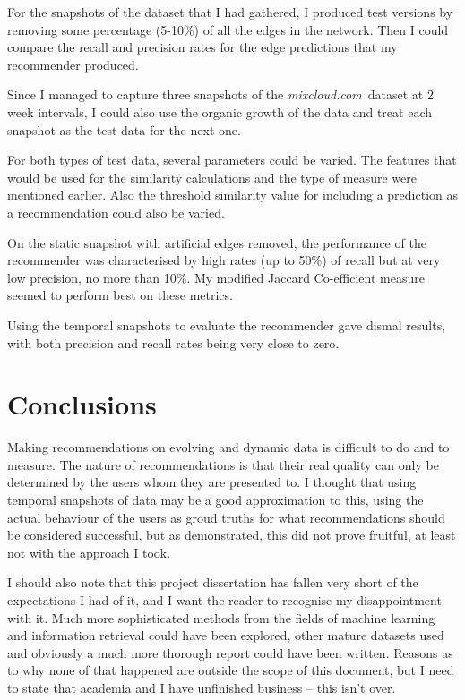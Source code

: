 \documentclass[a4paper,12pt,twoside,notitlepage]{report}
\def\mixurl{\emph{mixcloud.com}}
\begin{document}
For the snapshots of the dataset that I had gathered, I produced test versions
by removing some percentage (5-10\%) of all the edges in the network. Then I
could compare the recall and precision rates for the edge predictions that my
recommender produced.

Since I managed to capture three snapshots of the \mixurl\ dataset at 2 week
intervals, I could also use the organic growth of the data and treat each
snapshot as the test data for the next one.

For both types of test data, several parameters could be varied. The features
that would be used for the similarity calculations and the type of measure were
mentioned earlier. Also the threshold similarity value for including a
prediction as a recommendation could also be varied.

On the static snapshot with artificial edges removed, the performance of the
recommender was characterised by high rates (up to 50\%) of recall but at very
low precision, no more than 10\%. My modified Jaccard Co-efficient measure
seemed to perform best on these metrics.

Using the temporal snapshots to evaluate the recommender gave dismal results,
with both precision and recall rates being very close to zero.
\chapter{Conclusions}

Making recommendations on evolving and dynamic data is difficult to do and
to measure. The nature of recommendations is that their real quality can only be
determined by the users whom they are presented to. I thought that using
temporal snapshots of data may be a good approximation to this, using the
actual behaviour of the users as groud truths for what recommendations should
be considered successful, but as demonstrated, this did not prove fruitful, at
least not with the approach I took.

I should also note that this project dissertation has fallen very short of
the expectations I had of it, and I want the reader to recognise my
disappointment with it. Much more sophisticated methods from the fields of
machine learning and information retrieval could have been explored, other
mature datasets used and obviously a much more thorough report could have been
written. Reasons as to why none of that happened are outside the scope of this
document, but I need to state that academia and I have unfinished business --
this isn't over.
\end{document}
